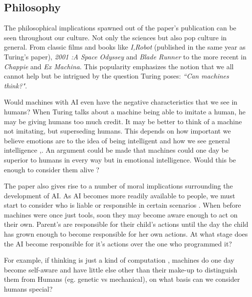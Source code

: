 \documentclass{scrartcl}
\begin{document}
\subsection{Philosophy}

The philosophical implications spawned out of the paper's publication can be seen throughout our culture. Not only the sciences but also pop culture in general. From classic films and books like \textit{I,Robot} (published in the same year as Turing's paper), \textit{2001 :A Space Odyssey} and \textit{Blade Runner} to the more recent in \textit{Chappie} and \textit{Ex Machina}. This popularity emphasizes the notion that we all cannot help but be intrigued by the question Turing poses: \textit{\textquotedblleft Can machines think?"}. 

Would machines with AI even have the negative characteristics that we see in humans? When Turing talks about a machine being able to imitate a human, he may be giving humans too much credit. It may be better to think of a machine not imitating, but superseding humans. This depends on how important we believe emotions are to the idea of being intelligent and how we see general intelligence \cite{mccarthy1969some:14},\cite{brooks1999cambrian:15}. An argument could be made that machines could one day be superior to humans in every way but in emotional intelligence. Would this be enough to consider them alive \cite[p.21-32]{picard1997affective:16}? 

The paper also gives rise to a number of moral implications surrounding the development of AI. As AI becomes more readily available to people, we must start to consider who is liable or responsible in certain scenarios \cite[p84-91]{kaplan2015humans:17}. When before machines were once just tools, soon they may become aware enough to act on their own. Parent's are responsible for their child's actions until the day the child has grown enough to become responsible for her own actions. At what stage does the AI become responsible for it's actions over the one who programmed it?

For example, if thinking is just a kind of computation \cite{pinker2003mind:18}, machines do one day become self-aware and have little else other than their make-up to distinguish them from Humans (eg. genetic vs mechanical), on what basis can we consider humans special?
\end{document}

